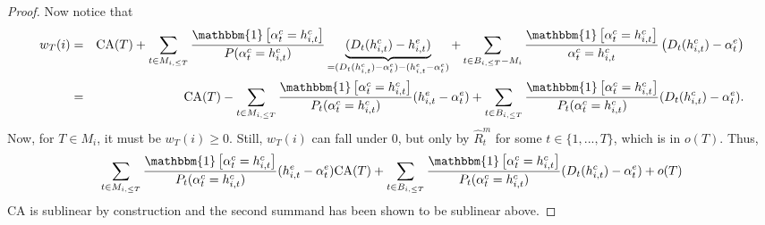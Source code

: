 \documentclass[submission,copyright,creativecommons]{eptcs}
\begin{document}
\begin{extendedonlyblock}
\begin{proof}
Now notice that
\begin{eqnarray*}
w_{T}(i) &=& \mathrm{CA}(T) + \sum_{t\in M_{i,\leq T}} \frac{\mathbbm{1}\left[\alpha_t^c=h_{i,t}^c\right]}{P(\alpha_t^c=h_{i,t}^c)} \underbrace{(D_t(h_{i,t}^c) - h_{i,t}^e)}_{=(D_t(h_{i,t}^c)-\alpha_t^e)-(h_{i,t}^e-\alpha_t^e)} %
%
+   \sum_{t\in B_{i,\leq T}-M_i} \frac{\mathbbm{1}\left[\alpha_t^c=h_{i,t}^c\right]}{\alpha_t^c=h_{i,t}^c} \left(D_t(h_{i,t}^c) - \alpha_t^e\right)\\
&=&
\mathrm{CA}(T) -  \sum_{t\in M_{i,\leq T}} \frac{\mathbbm{1}\left[\alpha_t^c=h_{i,t}^c\right]}{P_t(\alpha_t^c=h_{i,t}^c)} (h_{i,t}^e - \alpha_t^e) %
%
+ \sum_{t\in B_{i,\leq T}} \frac{\mathbbm{1}\left[\alpha_t^c=h_{i,t}^c\right]}{P_t(\alpha_t^c=h_{i,t}^c)} (D_t(h_{i,t}^c)-\alpha_t^e).
\end{eqnarray*}
Now, for $T\in M_i$, it must be $w_{T}(i)\geq 0$. Still, $w_{T}(i)$ can fall under $0$, but only by $\hat R^m_t$ for some $t\in \{1,...,T\}$, which is in  $o(T)$. Thus,
\begin{equation*}
\sum_{t\in M_{i,\leq T}} \frac{\mathbbm{1}\left[\alpha_t^c=h_{i,t}^c\right]}{P_t(\alpha_t^c=h_{i,t}^c)} (h_{i,t}^e - \alpha_t^e) %
\mathrm{CA}(T) + \sum_{t\in B_{i,\leq T}} \frac{\mathbbm{1}\left[\alpha_t^c=h_{i,t}^c\right]}{P_t(\alpha_t^c=h_{i,t}^c)} (D_t(h_{i,t}^c)-\alpha_t^e) + o(T)
\end{equation*}
$\mathrm{CA}$ is sublinear by construction and the second summand has been shown to be sublinear above.
\end{proof}
\end{extendedonlyblock}
\end{document}

